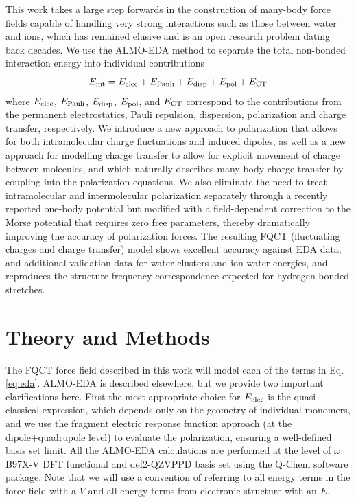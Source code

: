 \documentclass[journal=jctcce,manuscript=article]{achemso}
\begin{document}
This work takes a large step forwards in the construction of many-body force fields capable of handling very strong interactions such as those
between water and ions, which has remained elusive and is an open research problem dating back decades. We use the ALMO-EDA method\cite{khaliullin2007,horn2016probing} to separate the total non-bonded interaction energy into individual contributions
\begin{equation}
E_{\rm int} = E_{\rm elec} + E_{\rm Pauli} + E_{\rm disp} + E_{\rm pol} +  E_{\rm CT}
 \label{eq:eda}
\end{equation}
where $E_{\rm elec}$, $E_{\rm Pauli}$, $ E_{\rm disp}$, $E_{\rm pol}$, and  $E_{\rm CT}$ correspond to the contributions from the permanent electrostatics, Pauli repulsion, dispersion, polarization and charge transfer, respectively. We introduce a new approach to polarization that allows for both intramolecular charge fluctuations and induced dipoles, as well as a new approach for modelling charge transfer to allow for explicit movement of charge between molecules, and which naturally describes many-body charge transfer by coupling into the polarization equations. We also eliminate the need to treat intramolecular and intermolecular polarization separately through a recently reported one-body potential\cite{Sami2024} but modified with a field-dependent correction to the Morse potential that requires zero free parameters, thereby dramatically improving the accuracy of polarization forces. The resulting FQCT (fluctuating charges and charge transfer) model shows excellent accuracy against EDA data, and additional validation data for water clusters and ion-water energies, and reproduces the structure-frequency correspondence expected for hydrogen-bonded  stretches.

\section*{Theory and Methods}
The FQCT force field described in this work will model each of the terms in Eq. \ref{eq:eda}. ALMO-EDA is described elsewhere\cite{khaliullin2007,horn2016probing}, but we provide two important clarifications here. First the most appropriate choice for $E_{\rm elec}$ is the quasi-classical expression, which depends only on the geometry of individual monomers\cite{mao2017energy}, and we use the fragment electric response function approach (at the dipole+quadrupole level) to evaluate the  polarization, ensuring a well-defined basis set limit.\cite{horn2015} All the ALMO-EDA calculations are performed at the level of $\omega$B97X-V DFT functional\cite{Mardirossian2014} and def2-QZVPPD basis set\cite{Rappoport2010} using the Q-Chem software package\cite{Epifanovsky2021}. Note that we will use a convention of referring to all energy terms in the force field with a $V$ and all energy terms from electronic structure
with an $E$. 
\end{document}
